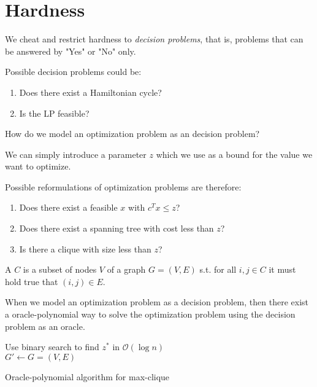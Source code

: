 

\section{Hardness}
We cheat and restrict hardness to \emph{decision problems}, that is, problems
that can be answered by "Yes" or "No" only.
\begin{example} Possible decision problems could be:
    \begin{enumerate}
        \item Does there exist a Hamiltonian cycle?
        \item Is the LP feasible?
    \end{enumerate}
\end{example}
\begin{question}
    How do we model an optimization problem as an decision problem?
\end{question}
\begin{answer}
    We can simply introduce a parameter $z$ which we use as a bound for the value we want to optimize.
\end{answer}
\begin{example} Possible reformulations of optimization problems are therefore:
    \begin{enumerate}
        \item Does there exist a feasible $x$ with $c^Tx \leq z$?
        \item Does there exist a spanning tree with cost less than $z$?
        \item Is there a clique with size less than $z$?
    \end{enumerate}
\end{example}
\begin{definition}
    A  $C$ is a subset of nodes $V$ of a graph $G=(V,E)$ s.t.
    for all $i,j \in C$ it must hold true that $(i,j)\in E$.
\end{definition}
\begin{theorem}
    When we model an optimization problem as a decision problem, then there exist
    a oracle-polynomial way to solve the optimization problem using the decision problem
    as an oracle. \label{th:opt-dec-problem}
\end{theorem}
\begin{algorithm}[H]
    \SetAlgoLined
    Use binary search to find $z^*$ in $\mathcal{O}(\log n)$\\
    $G' \leftarrow G = (V,E)$\\
    \caption{Oracle-polynomial algorithm for max-clique}
\end{algorithm} \noindent

